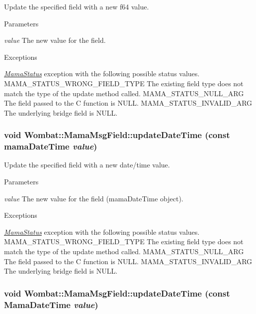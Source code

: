 Update the specified field with a new f64 value. 
\begin{DoxyParams}{Parameters}
\item[{\em value}]The new value for the field.\end{DoxyParams}

\begin{DoxyExceptions}{Exceptions}
\item[{\em \hyperlink{classWombat_1_1MamaStatus}{MamaStatus}}]exception with the following possible status values. MAMA\_\-STATUS\_\-WRONG\_\-FIELD\_\-TYPE The existing field type does not match the type of the update method called. MAMA\_\-STATUS\_\-NULL\_\-ARG The field passed to the C function is NULL. MAMA\_\-STATUS\_\-INVALID\_\-ARG The underlying bridge field is NULL. \end{DoxyExceptions}
\hypertarget{classWombat_1_1MamaMsgField_aff3f3665afa5dc581b059129dcddde46}{
\subsubsection[{updateDateTime}]{\setlength{\rightskip}{0pt plus 5cm}void Wombat::MamaMsgField::updateDateTime (const mamaDateTime {\em value})}}
\label{classWombat_1_1MamaMsgField_aff3f3665afa5dc581b059129dcddde46}


Update the specified field with a new date/time value. 
\begin{DoxyParams}{Parameters}
\item[{\em value}]The new value for the field (mamaDateTime object).\end{DoxyParams}

\begin{DoxyExceptions}{Exceptions}
\item[{\em \hyperlink{classWombat_1_1MamaStatus}{MamaStatus}}]exception with the following possible status values. MAMA\_\-STATUS\_\-WRONG\_\-FIELD\_\-TYPE The existing field type does not match the type of the update method called. MAMA\_\-STATUS\_\-NULL\_\-ARG The field passed to the C function is NULL. MAMA\_\-STATUS\_\-INVALID\_\-ARG The underlying bridge field is NULL. \end{DoxyExceptions}
\hypertarget{classWombat_1_1MamaMsgField_ab68bf6c821499d375e95db44eb5bb256}{
\subsubsection[{updateDateTime}]{\setlength{\rightskip}{0pt plus 5cm}void Wombat::MamaMsgField::updateDateTime (const {\bf MamaDateTime} {\em value})}}
\label{classWombat_1_1MamaMsgField_ab68bf6c821499d375e95db44eb5bb256}


